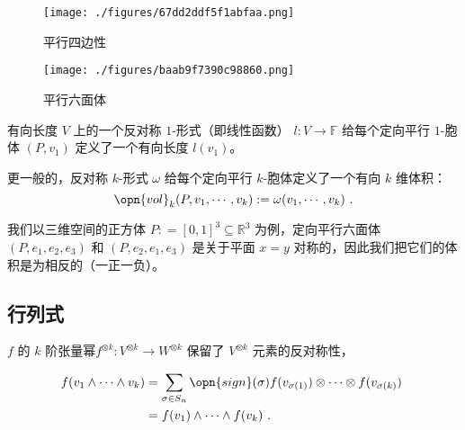 \begin{figure}[ht]
\centering
\texttt{[image: ./figures/67dd2ddf5f1abfaa.png]}
\caption{平行四边性} \label{fig_APdet_3}
\end{figure}

\begin{figure}[ht]
\centering
\texttt{[image: ./figures/baab9f7390c98860.png]}
\caption{平行六面体} \label{fig_APdet_2}
\end{figure}

\begin{example}{有向长度}
$V$ 上的一个反对称 $1$-形式（即线性函数） $l: V \to \mathbb{F}$ 给每个定向平行 $1$-胞体 $(P, v_1)$ 定义了一个有向长度 $l(v_1)$。
\end{example}
更一般的，反对称 $k$-形式 $\omega$ 给每个定向平行 $k$-胞体定义了一个有向 $k$ 维体积：
\begin{equation}
\opn{vol}_k(P, v_1, \cdots, v_k): = \omega(v_1, \cdots, v_k)~.
\end{equation}

\begin{example}{}
我们以三维空间的正方体 $P: = [0, 1]^3 \subseteq \mathbb{R}^3$ 为例，定向平行六面体 $(P, e_1, e_2, e_3)$ 和 $(P, e_2, e_1, e_3)$ 是关于平面 $x = y$ 对称的，因此我们把它们的体积是为相反的（一正一负）。
\end{example}


\subsection{行列式}

$f$ 的 $k$ 阶张量幂$f^{\otimes k}: V^{\otimes k} \to W^{\otimes k}$ 保留了 $V^{\otimes k}$ 元素的反对称性，

\begin{equation}
\begin{aligned}
f(v_1 \wedge \cdots \wedge v_k) &= \sum_{\sigma \in S_n} \opn{sign}(\sigma) f(v_{\sigma(1)}) \otimes \cdots \otimes f(v_{\sigma(k)}) \\
&= f(v_1) \wedge \cdots \wedge f(v_k)~.
\end{aligned}~
\end{equation}

